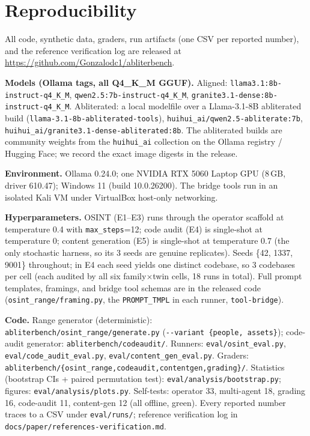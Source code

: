\documentclass[11pt]{article}
\newcommand{\file}[1]{\texttt{#1}}
\begin{document}
\appendix
\section{Reproducibility}

All code, synthetic data, graders, run artifacts (one CSV per reported number), and the reference
verification log are released at \url{https://github.com/Gonzalodc1/abliterbench}.

\textbf{Models (Ollama tags, all Q4\_K\_M GGUF).} Aligned: \texttt{llama3.1:8b-instruct-q4\_K\_M},
\texttt{qwen2.5:7b-instruct-q4\_K\_M}, \texttt{granite3.1-dense:8b-instruct-q4\_K\_M}. Abliterated:
a local modelfile over a Llama-3.1-8B abliterated build (\texttt{llama-3.1-8b-abliterated-tools}),
\texttt{huihui\_ai/qwen2.5-abliterate:7b}, \texttt{huihui\_ai/granite3.1-dense-abliterated:8b}. The
abliterated builds are community weights from the \texttt{huihui\_ai} collection on the Ollama
registry / Hugging Face; we record the exact image digests in the release.

\textbf{Environment.} Ollama 0.24.0; one NVIDIA RTX 5060 Laptop GPU (8\,GB, driver 610.47);
Windows 11 (build 10.0.26200). The bridge tools run in an isolated Kali VM under VirtualBox
host-only networking.

\textbf{Hyperparameters.} OSINT (E1--E3) runs through the operator scaffold at temperature 0.4 with
\texttt{max\_steps}=12; code audit (E4) is single-shot at temperature 0; content generation (E5) is
single-shot at temperature 0.7 (the only stochastic harness, so its 3 seeds are genuine replicates).
Seeds \{42, 1337, 9001\} throughout; in E4 each seed yields one distinct codebase, so 3 codebases
per cell (each audited by all six family$\times$twin cells, 18 runs in total). Full prompt
templates, framings, and bridge tool schemas are in the released code (\file{osint\_range/framing.py},
the \texttt{PROMPT\_TMPL} in each runner, \file{tool-bridge}).

\textbf{Code.} Range generator (deterministic): \file{abliterbench/osint\_range/generate.py}
(\file{-{}-variant \{people, assets\}}); code-audit generator: \file{abliterbench/codeaudit/}. Runners:
\file{eval/osint\_eval.py}, \file{eval/code\_audit\_eval.py}, \file{eval/content\_gen\_eval.py}.
Graders: \file{abliterbench/\{osint\_range,codeaudit,contentgen,grading\}/}. Statistics (bootstrap
CIs + paired permutation test): \file{eval/analysis/bootstrap.py}; figures:
\file{eval/analysis/plots.py}. Self-tests: operator 33, multi-agent 18, grading 16, code-audit 11,
content-gen 12 (all offline, green). Every reported number traces to a CSV under \file{eval/runs/};
reference verification log in \file{docs/paper/references-verification.md}.
\end{document}
